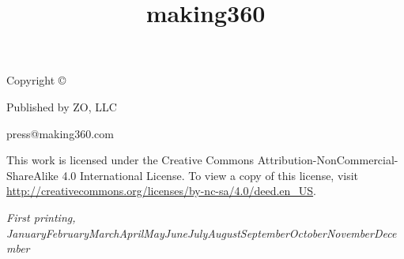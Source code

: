 \documentclass[notoc]{tufte-book} %
\title{making360} %
\author{} %
\newcommand{\monthyear}{\ifcase\month\or January\or February\or March\or April\or May\or June\or July\or August\or September\or October\or November\or December\fi\space\number\year} %
\begin{document}
\setlength{\parskip}{0.6cm plus0.5mm minus0.5mm}
\setlength{\parindent}{0pt}
\let\cleardoublepage\clearpage

\makeatletter
\def\@makechapterhead#1{%
  {\parindent \z@ \raggedright \normalfont
    \ifnum \c@secnumdepth >\m@ne
        \huge\bfseries \@chapapp\space \thechapter
        \par\nobreak
        \vskip 20\p@
    \fi
    \interlinepenalty\@M
    \Huge \bfseries #1\par\nobreak
    \vskip 20\p@
  }}
\makeatother


\frontmatter



\maketitlepage


\newpage
\begin{fullwidth}
\thispagestyle{empty}
\setlength{\parindent}{0pt}
\setlength{\parskip}{\baselineskip}
Copyright \copyright\ \the\year\ \thanklessauthor

\par{Published by ZO, LLC}

\par{press@making360.com}

\par This work is licensed under the Creative Commons Attribution-NonCommercial-ShareAlike 4.0 International License. To view a copy of this license, visit \url{http://creativecommons.org/licenses/by-nc-sa/4.0/deed.en_US}.

\par\textit{First printing, \monthyear}
\end{fullwidth}


\tableofcontents %










\end{document}

